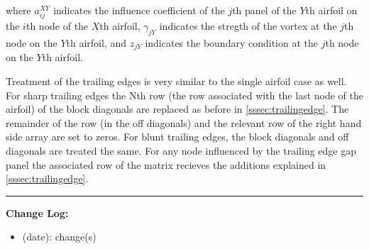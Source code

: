 \documentclass[]{article}
\begin{document}
\noindent where \(a_{ij}^{XY}\) indicates the influence coefficient of the \(j\)th panel of the \(Y\)th airfoil on the \(i\)th node of the \(X\)th airfoil, \(\gamma_{jY}\) indicates the stregth of the vortex at the \(j\)th node on the \(Y\)th airfoil, and \(z_{jY}\) indicates the boundary condition at the \(j\)th node on the \(Y\)th airfoil.

Treatment of the trailing edges is very similar to the single airfoil case as well.  For sharp trailing edges the Nth row (the row associated with the last node of the airfoil) of the block diagonals are replaced as before in \cref{sssec:trailingedge}. The remainder of the row (in the off diagonals) and the relevant row of the right hand side array are set to zeros.  For blunt trailing edges, the block diagonals and off diagonals are treated the same. For any node influenced by the trailing edge gap panel the associated row of the matrix recieves the additions explained in \cref{sssec:trailingedge}.



\newpage

{}


\vspace{1cm}
\hrule
\vspace{1cm}

\noindent  \textbf{Change Log:}

\begin{itemize}
	\item (date): change(s)
\end{itemize}
\end{document}
